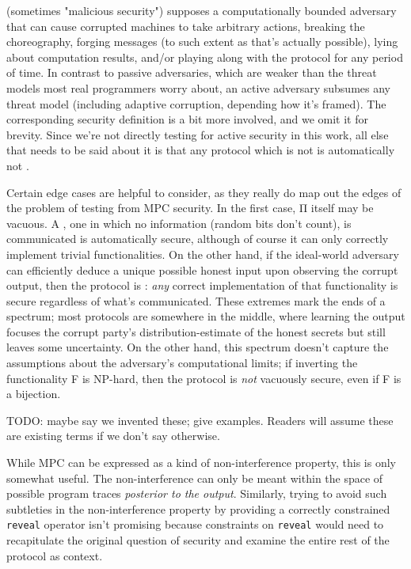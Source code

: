 \documentclass[conference]{IEEEtran}
\begin{document}
 (sometimes "malicious security")
supposes a computationally bounded adversary that can cause corrupted machines to take arbitrary actions,
breaking the choreography,
forging messages (to such extent as that's actually possible),
lying about computation results,
and/or playing along with the protocol for any period of time.
In contrast to passive adversaries, which are weaker than the threat models most real programmers worry about,
an active adversary subsumes any threat model (including adaptive corruption, depending how it's framed).
The corresponding security definition is a bit more involved, and we omit it for brevity.
Since we're not directly testing for active security in this work,
all else that needs to be said about it is that
any protocol which is not  is automatically not .

Certain edge cases are helpful to consider, as they really do map out the edges of the problem of testing from MPC security.
In the first case, Π itself may be vacuous.
A , one in which no information (random bits don't count), is communicated is automatically secure,
although of course it can only correctly implement trivial functionalities.
On the other hand, if the ideal-world adversary can efficiently deduce a unique possible honest input upon observing the corrupt output,
then the protocol is : \textit{any} correct implementation of that functionality is secure regardless of what's communicated.
These extremes mark the ends of a spectrum; most protocols are somewhere in the middle,
where learning the output focuses the corrupt party's distribution-estimate of the honest secrets but still leaves some uncertainty.
On the other hand, this spectrum doesn't capture the assumptions about the adversary's computational limits;
if inverting the functionality F is NP-hard, then the protocol is \textit{not} vacuously secure, even if F is a bijection.

TODO: maybe say we invented these; give examples. Readers will assume these are existing terms if we don't say otherwise.

While MPC can be expressed as a kind of non-interference property, this is only somewhat useful.
The non-interference can only be meant within the space of possible program traces \textit{posterior to the output}.
Similarly, trying to avoid such subtleties in the non-interference property by providing a correctly constrained \texttt{reveal} operator
isn't promising because constraints on \texttt{reveal} would need to recapitulate the original question of security
and examine the entire rest of the protocol as context.
\end{document}
